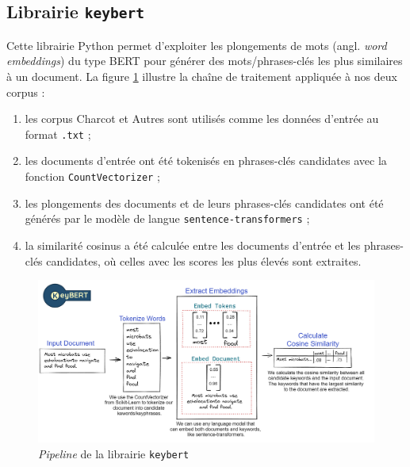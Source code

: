\subsection{Librairie \texttt{keybert}}

Cette librairie Python permet d'exploiter les plongements de mots (angl. \textit{word embeddings}) du type \textsc{BERT} pour générer des mots/phrases-clés les plus similaires à un document.
La figure \ref{fig:keybert} illustre la chaîne de traitement appliquée à nos deux corpus : 
\begin{enumerate}
\item les corpus \og Charcot \fg{} et \og Autres \fg{} sont utilisés comme les données d'entrée au format \texttt{.txt} ;
\item les documents d'entrée ont été tokenisés en phrases-clés candidates avec la fonction \texttt{CountVectorizer} ; 
\item les plongements des documents et de leurs phrases-clés candidates ont été générés par le modèle de langue \texttt{sentence-transformers} ;
\item la similarité cosinus a été calculée entre les documents d'entrée et les phrases-clés candidates, où celles avec les scores les plus élevés sont extraites.
\end{enumerate}

\begin{figure}[!h]
    \centering
    \includegraphics[width=1\textwidth]{img/keybert.png}
    \caption[\textit{Pipeline} de la librairie \texttt{keybert}.]{\textit{Pipeline} de la librairie \texttt{keybert}\protect{}}
    \label{fig:keybert}
\end{figure}


